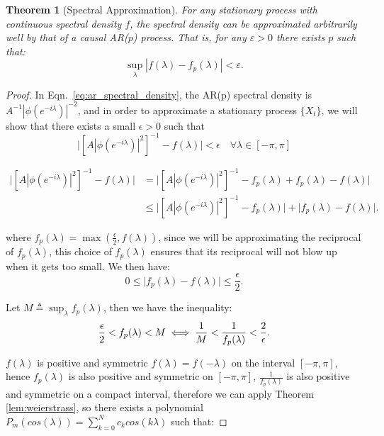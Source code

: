\documentclass[preprint]{aastex}
\theoremstyle{nonitalicname}
\newtheorem{theorem}{Theorem}[section]
\theoremstyle{plain}
\theoremstyle{remark}
\begin{document}
\begin{theorem}[Spectral Approximation]
For any stationary process with continuous spectral density $f$, the spectral density can be approximated arbitrarily well by that of a causal AR($p$) process. That is, for any $\varepsilon > 0$ there exists $p$ such that:
$$\sup_{\lambda} |f(\lambda) - f_p(\lambda)| < \varepsilon.$$
\end{theorem}
\begin{proof}
In Eqn.~\ref{eq:ar_spectral_density}, the AR(p) spectral density is $A^{-1}|\phi(e^{-i\lambda})|^{-2}$, and in order to approximate a stationary process $\{X_t\}$, we will show that there exists a small $\epsilon >0$ such that
\begin{equation}
    \mid[A|\phi(e^{-i\lambda})|^2]^{-1} - f(\lambda) \mid < \epsilon \quad \forall \lambda \in [-\pi, \pi]
\end{equation}


\begin{equation}\label{eq:ar_prox_1}
\begin{aligned}
\big| [A|\phi(e^{-i\lambda})|^2]^{-1} - f(\lambda) \big|
&= \big| [A|\phi(e^{-i\lambda})|^2]^{-1} - f_p(\lambda) + f_p(\lambda) - f(\lambda) \big| \\
&\leq \big| [A|\phi(e^{-i\lambda})|^2]^{-1} - f_p(\lambda) \big|
   + \big| f_p(\lambda) - f(\lambda) \big|.\,
   \end{aligned}
\end{equation}

where $f_p(\lambda) = \max\!\left(\frac{\epsilon}{2}, f(\lambda) \right)$, since we will be approximating the reciprocal of $f_p(\lambda)$, this choice of $f_p(\lambda)$ ensures that its reciprocal will not blow up when it gets too small. We then have:
\begin{equation}\label{eq:n}
0 \leq \big| f_p(\lambda) - f(\lambda) \big| \leq \frac{\epsilon}{2}.
\end{equation}


Let $M \triangleq \sup_{\lambda} f_p(\lambda)$, then we have the inequality: 
\begin{equation}\label{eq:fq_inequal}
    \frac{\epsilon}{2} < f_p(\lambda) < M\\
\iff \frac{1}{M} < \frac{1}{f_p(\lambda)} < \frac{2}{\epsilon}.
\end{equation}

$f(\lambda)$ is positive and symmetric $f(\lambda) = f(-\lambda)$ on the interval $[-\pi, \pi]$, hence $f_p(\lambda)$ is also positive and symmetric on $[-\pi, \pi]$, $\frac{1}{f_p({\lambda})}$ is also positive and symmetric on a compact interval, therefore we can apply Theorem \ref{lem:weierstrass}, so there exists a polynomial $P_m(cos(\lambda)) = \sum_{k=0}^N c_k cos(k\lambda)$ such that:


\end{proof}
\end{document}
